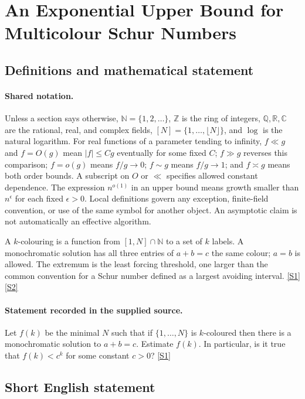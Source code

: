 \documentclass[11pt,a4paper]{article}
\newcommand{\N}{\mathbb{N}}
\newcommand{\Z}{\mathbb{Z}}
\newcommand{\Q}{\mathbb{Q}}
\newcommand{\R}{\mathbb{R}}
\newcommand{\C}{\mathbb{C}}
\newcommand{\sref}[2]{\hyperlink{source:#1:#2}{[S#2]}}
\begin{document}
\section{An Exponential Upper Bound for Multicolour Schur Numbers}\label{statement}


\subsection{Definitions and mathematical statement}

\paragraph{Shared notation.}Unless a section says otherwise, $\N=\{1,2,\ldots\}$,
$\Z$ is the ring of integers, $\Q,\R,\C$ are the rational, real, and complex
fields, $[N]=\{1,\ldots,\lfloor N\rfloor\}$, and $\log$ is the natural
logarithm. For real functions of a parameter tending to infinity,
$f\ll g$ and $f=O(g)$ mean $|f|\leq Cg$ eventually for some fixed $C$;
$f\gg g$ reverses this comparison; $f=o(g)$ means $f/g\to0$;
$f\sim g$ means $f/g\to1$; and $f\asymp g$ means both order bounds.
A subscript on $O$ or $\ll$ specifies allowed constant dependence.
The expression $n^{o(1)}$ in an upper bound means growth smaller than
$n^\epsilon$ for each fixed $\epsilon>0$. Local definitions govern any
exception, finite-field convention, or use of the same symbol for another
object. An asymptotic claim is not automatically an effective algorithm.



A $k$-colouring is a function from $[1,N]\cap\N$ to a set of $k$ labels. A monochromatic solution has all three entries of $a+b=c$ the same colour; $a=b$ is allowed. The extremum is the least forcing threshold, one larger than the common convention for a Schur number defined as a largest avoiding interval. \sref{statement}{1} \sref{statement}{2}

\paragraph{Statement recorded in the supplied source.}
Let $f(k)$ be the minimal $N$ such that if $\{1,\ldots,N\}$ is $k$-coloured then there is a monochromatic solution to $a+b=c$. Estimate $f(k)$. In particular, is it true that $f(k) < c^k$ for some constant $c>0$? \sref{statement}{1}

\subsection{Short English statement}
\end{document}
